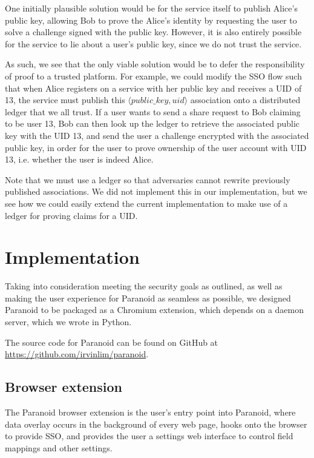 \documentclass[letterpaper,twocolumn,10pt]{article}
\begin{document}
One initially plausible solution would be for the service itself to publish Alice's public key, allowing Bob to prove the Alice's identity by requesting the user to solve a challenge signed with the public key. However, it is also entirely possible for the service to lie about a user's public key, since we do not trust the service.

As such, we see that the only viable solution would be to defer the responsibility of proof to a trusted platform. For example, we could modify the SSO flow such that when Alice registers on a service with her public key and receives a UID of 13, the service must publish this $\langle public\_key, uid \rangle$ association onto a distributed ledger that we all trust. If a user wants to send a share request to Bob claiming to be user 13, Bob can then look up the ledger to retrieve the associated public key with the UID 13, and send the user a challenge encrypted with the associated public key, in order for the user to prove ownership of the user account with UID 13, i.e. whether the user is indeed Alice.

Note that we must use a ledger so that adversaries cannot rewrite previously published associations. We did not implement this in our implementation, but we see how we could easily extend the current implementation to make use of a ledger for proving claims for a UID.

\section{Implementation}

Taking into consideration meeting the security goals as outlined, as well as making the user experience for Paranoid as seamless as possible, we designed Paranoid to be packaged as a Chromium extension, which depends on a daemon server, which we wrote in Python.

The source code for Paranoid can be found on GitHub at \url{https://github.com/irvinlim/paranoid}.

\subsection{Browser extension}

The Paranoid browser extension is the user's entry point into Paranoid, where data overlay occurs in the background of every web page, hooks onto the browser to provide SSO, and provides the user a settings web interface to control field mappings and other settings.
\end{document}
